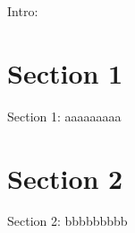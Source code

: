 Intro: 

\minitoc

\section{Section 1}
Section 1: aaaaaaaaa

\section{Section 2}
Section 2: bbbbbbbbb